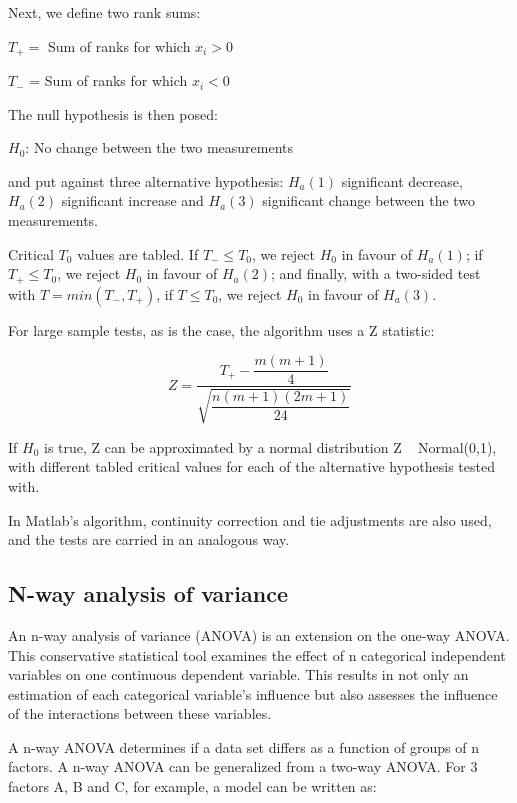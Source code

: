 Next, we define two rank sums:

$T_+ =$ Sum of ranks for which $x_i>0$

$T_-$ = Sum of ranks for which $x_i<0$

The null hypothesis is then posed:

\begin{center}
$H_0$: No change between the two measurements
\end{center} 

and put against three alternative hypothesis: $H_a(1)$ significant decrease, $H_a(2)$ significant increase and $H_a(3)$ significant change between the two measurements.

Critical $T_0$ values are tabled. If $T_- \leq T_0$, we reject $H_0$ in favour of $H_a(1)$; if $T_+ \leq T_0$, we reject $H_0$ in favour of $H_a(2)$; and finally, with a two-sided test with $T=min(T_-, T_+)$, if  $T \leq T_0$, we reject $H_0$ in favour of $H_a(3)$.

For large sample tests, as is the case, the algorithm uses a Z statistic:

\begin{equation}
Z = \dfrac{T_+ - \dfrac{m(m+1)}{4}}{\sqrt{\dfrac{n(m+1)(2m+1)}{24}}}
\end{equation}

If $H_0$ is true, Z can be approximated by a normal distribution Z ~ Normal(0,1), with different tabled critical values for each of the alternative hypothesis tested with.

In Matlab's algorithm, continuity correction and tie adjustments are also used, and the tests are carried in an analogous way.

\subsection{N-way analysis of variance}
\label{subsec:subcsectionC}

An n-way analysis of variance (ANOVA) is an extension on the one-way ANOVA. This conservative statistical tool examines the effect of n categorical independent variables on one continuous dependent variable. This results in not only an estimation of each categorical variable's influence but also assesses the influence of the interactions between these variables.

A n-way ANOVA determines if a data set differs as a function of groups of n factors. A n-way ANOVA can be generalized from a two-way ANOVA. For 3 factors A, B and C, for example, a model can be written as:

